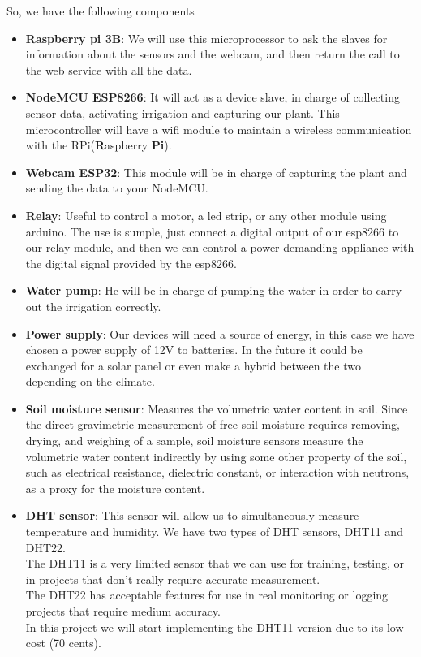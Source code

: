 \documentclass[11pt,a4paper]{article}
\begin{document}
So, we have the following components
\begin{itemize}
\item \textbf{Raspberry pi 3B}: We will use this microprocessor to ask the slaves for information about the sensors and the webcam, and then return the call to the web service with all the data.

\item \textbf{NodeMCU ESP8266}: It will act as a device slave, in charge of collecting sensor data, activating irrigation and capturing our plant. This microcontroller will have a wifi module to maintain a wireless communication with the RPi(\textbf{R}aspberry \textbf{Pi}).

\item \textbf{Webcam ESP32}: This module will be in charge of capturing the plant and sending the data to your NodeMCU.

\item \textbf{Relay}: Useful to control a motor, a led strip, or any other module using arduino. The use is sumple, just connect a digital output of our esp8266 to our relay module, and then we can control a power-demanding appliance with the digital signal provided by the esp8266.

\item \textbf{Water pump}: He will be in charge of pumping the water in order to carry out the irrigation correctly.

\item \textbf{Power supply}: Our devices will need a source of energy, in this case we have chosen a power supply of 12V to batteries. In the future it could be exchanged for a solar panel or even make a hybrid between the two depending on the climate.

\item \textbf{Soil moisture sensor}: Measures the volumetric water content in soil. Since the direct gravimetric measurement of free soil moisture requires removing, drying, and weighing of a sample, soil moisture sensors measure the volumetric water content indirectly by using some other property of the soil, such as electrical resistance, dielectric constant, or interaction with neutrons, as a proxy for the moisture content.

\item \textbf{DHT sensor}: This sensor will allow us to simultaneously measure temperature and humidity. We have two types of DHT sensors, DHT11 and DHT22.\\

The DHT11 is a very limited sensor that we can use for training, testing, or in projects that don't really require accurate measurement.\\

The DHT22 has acceptable features for use in real monitoring or logging projects that require medium accuracy.\\ 

In this project we will start implementing the DHT11 version due to its low cost (70 cents).
\end{itemize}
\end{document}
